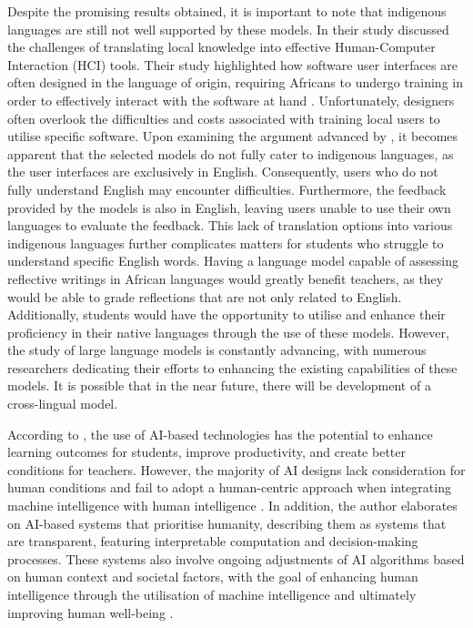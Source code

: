 \documentclass{article}
\begin{document}
Despite the promising results obtained, it is important to note that indigenous languages are still not well supported by these models. In their study \cite{winschiers2013toward} discussed the challenges of translating local knowledge into effective Human-Computer Interaction (HCI) tools. Their study highlighted how software user interfaces are often designed in the language of origin, requiring Africans to undergo training in order to effectively interact with the software at hand \cite{winschiers2013toward}. Unfortunately, designers often overlook the difficulties and costs associated with training local users to utilise specific software. Upon examining the argument advanced by \cite{winschiers2013toward}, it becomes apparent that the selected models do not fully cater to indigenous languages, as the user interfaces are exclusively in English. Consequently, users who do not fully understand English may encounter difficulties. Furthermore, the feedback provided by the models is also in English, leaving users unable to use their own languages to evaluate the feedback. This lack of translation options into various indigenous languages further complicates matters for students who struggle to understand specific English words. Having a language model capable of assessing reflective writings in African languages would greatly benefit teachers, as they would be able to grade reflections that are not only related to English. Additionally, students would have the opportunity to utilise and enhance their proficiency in their native languages through the use of these models. However, the study of large language models is constantly advancing, with numerous researchers dedicating their efforts to enhancing the existing capabilities of these models. It is possible that in the near future, there will be development of a cross-lingual model.

According to \cite{yang2021human}, the use of AI-based technologies has the potential to enhance learning outcomes for students, improve productivity, and create better conditions for teachers. However, the majority of AI designs lack consideration for human conditions and fail to adopt a human-centric approach when integrating machine intelligence with human intelligence \cite{yang2021human}.  In addition, the author elaborates on AI-based systems that prioritise humanity, describing them as systems that are transparent, featuring interpretable computation and decision-making processes. These systems also involve ongoing adjustments of AI algorithms based on human context and societal factors, with the goal of enhancing human intelligence through the utilisation of machine intelligence and ultimately improving human well-being \cite{yang2021human}.
\end{document}
